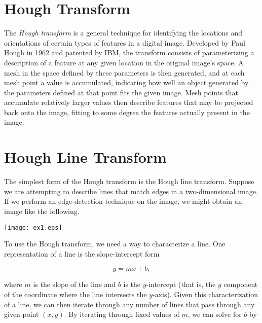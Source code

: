 \documentclass[12pt]{article}
\begin{document}



\section*{Hough Transform}

The \emph{Hough transform} is a general technique for identifying the locations and orientations of certain types of features in a digital image.  Developed by Paul Hough in 1962 and patented by IBM,
the transform consists of parameterizing a description of a feature at any given location in the original image's space.  A mesh in the space defined by these parameters is then generated, and at each mesh point a value is accumulated, indicating how well an object generated by the parameters defined at that point fits the given image.  Mesh points that accumulate relatively larger values then describe features that may be projected back onto the image, fitting to some degree the features actually present in the image.

\section*{Hough Line Transform}

The simplest form of the Hough transform is the Hough line transform.
Suppose we are attempting to describe lines that match edges in a two-dimensional image.  If we perform an edge-detection technique on
the image, we might obtain an image like the following.

\begin{center}
\texttt{[image: ex1.eps]}
\end{center}

To use the Hough transform, we need a way to characterize a line.
One representation of a line is the slope-intercept form

\begin{equation}
y = mx + b, \label{eq:sif}
\end{equation}

where $m$ is the slope of the line and $b$ is the $y$-intercept (that is, the $y$ component of the coordinate where the line intersects the $y$-axis).
Given this characterization of a line, we can then iterate through any number of lines that pass through any given point $(x, y)$.  By iterating through fixed values of $m$, we can solve for $b$ by
\end{document}
